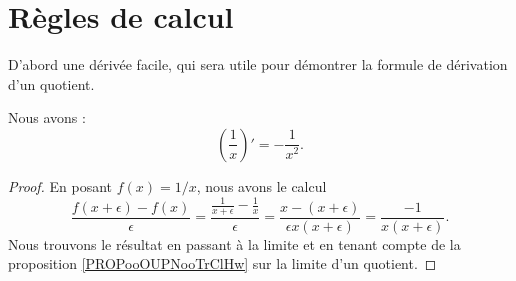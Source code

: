 
\section{Règles de calcul}

D'abord une dérivée facile, qui sera utile pour démontrer la formule de dérivation d'un quotient.
\begin{lemma}
	Nous avons :
	\begin{equation}
		\left( \frac{1}{ x } \right)'=-\frac{1}{ x^2 }.
	\end{equation}
\end{lemma}

\begin{proof}
	En posant \( f(x)=1/x\), nous avons le calcul
	\begin{equation}
		\frac{ f(x+\epsilon)-f(x) }{ \epsilon }=\frac{ \frac{1}{ x+\epsilon }-\frac{1}{ x } }{ \epsilon }=\frac{ x-(x+\epsilon) }{ \epsilon x(x+\epsilon) }=\frac{ -1 }{ x(x+\epsilon) }.
	\end{equation}
	Nous trouvons le résultat en passant à la limite et en tenant compte de la proposition \ref{PROPooOUPNooTrClHw} sur la limite d'un quotient.
\end{proof}


